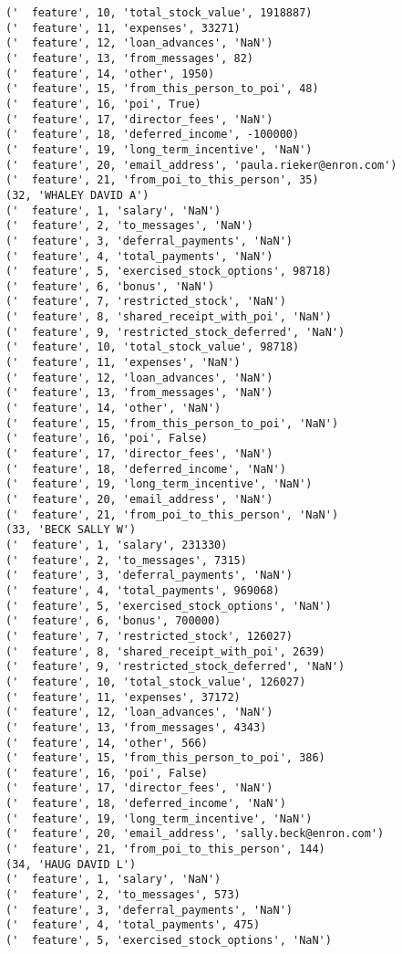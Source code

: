 \begin{verbatim}
('  feature', 10, 'total_stock_value', 1918887)
('  feature', 11, 'expenses', 33271)
('  feature', 12, 'loan_advances', 'NaN')
('  feature', 13, 'from_messages', 82)
('  feature', 14, 'other', 1950)
('  feature', 15, 'from_this_person_to_poi', 48)
('  feature', 16, 'poi', True)
('  feature', 17, 'director_fees', 'NaN')
('  feature', 18, 'deferred_income', -100000)
('  feature', 19, 'long_term_incentive', 'NaN')
('  feature', 20, 'email_address', 'paula.rieker@enron.com')
('  feature', 21, 'from_poi_to_this_person', 35)
(32, 'WHALEY DAVID A')
('  feature', 1, 'salary', 'NaN')
('  feature', 2, 'to_messages', 'NaN')
('  feature', 3, 'deferral_payments', 'NaN')
('  feature', 4, 'total_payments', 'NaN')
('  feature', 5, 'exercised_stock_options', 98718)
('  feature', 6, 'bonus', 'NaN')
('  feature', 7, 'restricted_stock', 'NaN')
('  feature', 8, 'shared_receipt_with_poi', 'NaN')
('  feature', 9, 'restricted_stock_deferred', 'NaN')
('  feature', 10, 'total_stock_value', 98718)
('  feature', 11, 'expenses', 'NaN')
('  feature', 12, 'loan_advances', 'NaN')
('  feature', 13, 'from_messages', 'NaN')
('  feature', 14, 'other', 'NaN')
('  feature', 15, 'from_this_person_to_poi', 'NaN')
('  feature', 16, 'poi', False)
('  feature', 17, 'director_fees', 'NaN')
('  feature', 18, 'deferred_income', 'NaN')
('  feature', 19, 'long_term_incentive', 'NaN')
('  feature', 20, 'email_address', 'NaN')
('  feature', 21, 'from_poi_to_this_person', 'NaN')
(33, 'BECK SALLY W')
('  feature', 1, 'salary', 231330)
('  feature', 2, 'to_messages', 7315)
('  feature', 3, 'deferral_payments', 'NaN')
('  feature', 4, 'total_payments', 969068)
('  feature', 5, 'exercised_stock_options', 'NaN')
('  feature', 6, 'bonus', 700000)
('  feature', 7, 'restricted_stock', 126027)
('  feature', 8, 'shared_receipt_with_poi', 2639)
('  feature', 9, 'restricted_stock_deferred', 'NaN')
('  feature', 10, 'total_stock_value', 126027)
('  feature', 11, 'expenses', 37172)
('  feature', 12, 'loan_advances', 'NaN')
('  feature', 13, 'from_messages', 4343)
('  feature', 14, 'other', 566)
('  feature', 15, 'from_this_person_to_poi', 386)
('  feature', 16, 'poi', False)
('  feature', 17, 'director_fees', 'NaN')
('  feature', 18, 'deferred_income', 'NaN')
('  feature', 19, 'long_term_incentive', 'NaN')
('  feature', 20, 'email_address', 'sally.beck@enron.com')
('  feature', 21, 'from_poi_to_this_person', 144)
(34, 'HAUG DAVID L')
('  feature', 1, 'salary', 'NaN')
('  feature', 2, 'to_messages', 573)
('  feature', 3, 'deferral_payments', 'NaN')
('  feature', 4, 'total_payments', 475)
('  feature', 5, 'exercised_stock_options', 'NaN')

\end{verbatim}
